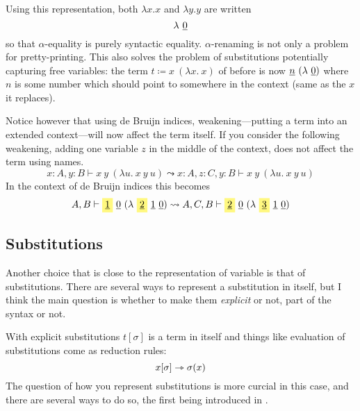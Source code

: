 Using this representation, both \(\lambda x.x\) and \(\lambda y.y\) are written
\[
  \lambda\ \underline{0}
\]
so that \(\alpha\)-equality is purely syntactic equality.
\(\alpha\)-renaming is not only a problem for pretty-printing.
This also solves the problem of substitutions potentially capturing free
variables: the term \(t \coloneqq x\ (\lambda x.\ x)\) of before is now
\(\db{n}\ (\lambda\ \db{0})\) where \(n\) is some number which should point to
somewhere in the context (same as the \(x\) it replaces).

Notice however that using de Bruijn indices, weakening---\ie putting a term into
an extended context---will now affect the term itself.
If you consider the following weakening, adding one variable \(z\) in the middle
of the context, does not affect the term using names.
\[
  x : A, y : B \vdash x\ y\ (\lambda u.\ x\ y\ u)
  \leadsto
  x : A, z : C, y : B \vdash x\ y\ (\lambda u.\ x\ y\ u)
\]
In the context of de Bruijn indices this becomes
\[
  A, B \vdash
  \highlight{\db{1}}\ \db{0}\ (\lambda\ \highlight{\db{2}}\ \db{1}\ \db{0})
  \leadsto
  A, C, B \vdash
  \highlight{\db{2}}\ \db{0}\ (\lambda\ \highlight{\db{3}}\ \db{1}\ \db{0})
\]


\subsection{Substitutions}

Another choice that is close to the representation of variable is that of
substitutions. There are several ways to represent a substitution in itself,
but I think the main question is whether to make them \emph{explicit} or not,
\ie part of the syntax or not.

With explicit substitutions \(t[\sigma]\) is a term in itself and things like
evaluation of substitutions come as reduction rules:
\[
  x[\sigma] \rightarrowtriangle \sigma(x)
\]
The question of how you represent substitutions is more curcial in this case,
and there are several ways to do so, the first being introduced in
.

